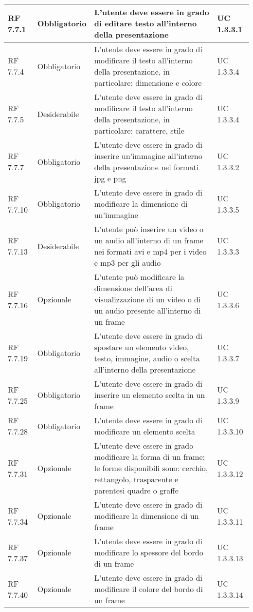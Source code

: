 {\begin{longtable} [c]{| p{2.5cm} | p{2.5cm} | p{6cm} |p{2.5cm}|}
 \hline 
RF 7.7.1 & Obbligatorio & L'utente deve essere in grado di editare testo all'interno della presentazione & UC 1.3.3.1\\ 
 \hline 
RF 7.7.4 & Obbligatorio & L'utente deve essere in grado di modificare il testo all'interno della presentazione, in particolare: dimensione e colore & UC 1.3.3.4\\ 
RF 7.7.5 & Desiderabile & L'utente deve essere in grado di modificare il testo all'interno della presentazione, in particolare: carattere, stile & UC 1.3.3.4\\
 \hline 
RF 7.7.7 & Obbligatorio & L'utente deve essere in grado di inserire un'immagine all'interno della presentazione nei formati jpg e png & UC 1.3.3.2\\ 
 \hline 
RF 7.7.10 & Obbligatorio & L'utente deve essere in grado di modificare la dimensione di un'immagine & UC 1.3.3.5\\ 
 \hline 
RF 7.7.13 & Desiderabile & L'utente può inserire un video o un audio all'interno di un frame nei formati avi e mp4 per i video e mp3 per gli audio & UC 1.3.3.3\\ 
 \hline 
RF 7.7.16 & Opzionale & L'utente può modificare la dimensione dell'area di visualizzazione di un video o di un audio presente all'interno di un frame & UC 1.3.3.6\\ 
 \hline 
RF 7.7.19 & Obbligatorio & L'utente deve essere in grado di spostare un elemento video, testo, immagine, audio o scelta all'interno della presentazione & UC 1.3.3.7\\ 
 \hline 
RF 7.7.25 & Obbligatorio & L'utente deve essere in grado di inserire un elemento scelta in un frame & UC 1.3.3.9\\ 
 \hline 
RF 7.7.28 & Obbligatorio & L'utente deve essere in grado di modificare un elemento scelta & UC 1.3.3.10\\ 
 \hline 
RF 7.7.31 & Opzionale & L'utente deve essere in grado modificare la forma di un frame; le forme disponibili sono: cerchio, rettangolo, trasparente e parentesi quadre o graffe & UC 1.3.3.12\\ 
 \hline 
RF 7.7.34 & Opzionale & L'utente deve essere in grado di modificare la dimensione di un frame & UC 1.3.3.11\\ 
 \hline 
RF 7.7.37 & Opzionale & L'utente deve essere in grado di modificare lo spessore del bordo di un frame & UC 1.3.3.13\\ 
 \hline 
RF 7.7.40 & Opzionale & L'utente deve essere in grado di modificare il colore del bordo di un frame & UC 1.3.3.14\\ 

\end{longtable}}

